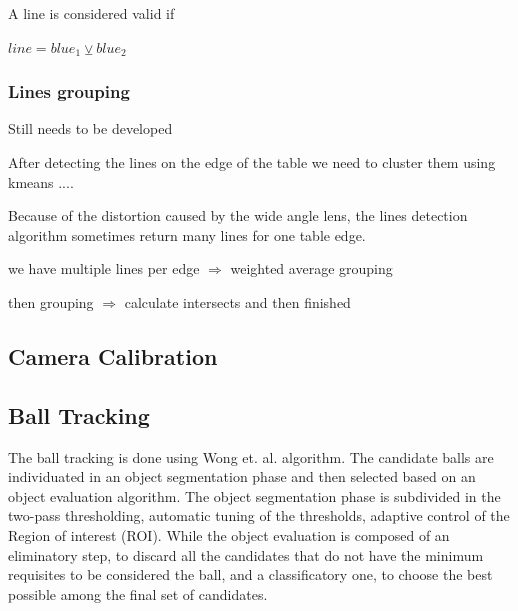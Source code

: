\documentclass[a4paper]{article}
\begin{document}
A line is considered valid if

$line = blue_{1} \veebar blue_{2}$

\subsubsection{Lines grouping}

Still needs to be developed

After detecting the lines on the edge of the table we need to cluster them using kmeans ....

Because of the distortion caused by the wide angle lens, the lines detection algorithm sometimes return many lines for one table edge.

we have multiple lines per edge $\Rightarrow$  weighted average grouping

then grouping $\Rightarrow$ calculate intersects and then finished

\subsection{Camera Calibration}
\subsection{Ball Tracking}

The ball tracking is done using Wong et. al.\cite{Wong} algorithm. The candidate balls are individuated in an object segmentation phase and then selected based on an object evaluation algorithm. The object segmentation phase is subdivided in the two-pass thresholding, automatic tuning of the thresholds, adaptive control of the Region of interest (ROI). While the object evaluation is composed of an eliminatory step, to discard all the candidates that do not have the minimum requisites to be considered the ball, and a classificatory one, to choose the best possible among the final set of candidates.
\end{document}
